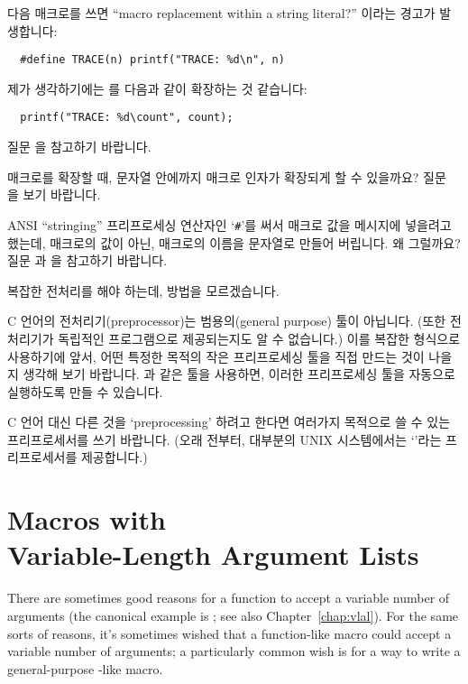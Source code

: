 \begin{faq}
	다음 매크로를 쓰면 ``macro replacement within a string literal?''
	이라는 경고가 발생합니다:
\begin{verbatim}
  #define TRACE(n) printf("TRACE: %d\n", n)
\end{verbatim}
	\noindent 제가 생각하기에는 를
	다음과 같이 확장하는 것 같습니다:
\begin{verbatim}
  printf("TRACE: %d\count", count);
\end{verbatim}

\A
	질문 을 참고하기 바랍니다.
\end{faq}

\begin{faq}
	매크로를 확장할 때, 문자열 안에까지 매크로 인자가 확장되게 할 수
        있을까요?
\A
	질문 을 보기 바랍니다.
\end{faq}

\begin{faq}
	ANSI ``stringing'' 프리프로세싱 연산자인 `\verb+#+'를 써서
        매크로 값을 메시지에 넣을려고 했는데, 매크로의 값이 아닌, 매크로의
        이름을 문자열로 만들어 버립니다. 왜 그럴까요?
\A
	질문 과 을 참고하기 바랍니다.
\end{faq}

\begin{faq}
	복잡한 전처리를 해야 하는데, 방법을 모르겠습니다.

\A
	C 언어의 전처리기(preprocessor)는 범용의(general purpose) 툴이
	아닙니다.  (또한 전처리기가 독립적인 프로그램으로 제공되는지도
	알 수 없습니다.) 이를 복잡한 형식으로 사용하기에 앞서,
	어떤 특정한 목적의 작은 프리프로세싱 툴을 직접 만드는 것이
	나을 지 생각해 보기 바랍니다.  과 같은 툴을 사용하면, 
	이러한 프리프로세싱 툴을 자동으로 실행하도록 만들 수 있습니다.

	C 언어 대신 다른 것을 `preprocessing' 하려고 한다면 여러가지 목적으로
        쓸 수 있는 프리프로세서를 쓰기 바랍니다.
	(오래 전부터, 대부분의 UNIX 시스템에서는 `'라는
	프리프로세서를 제공합니다.)
\end{faq}

\section{Macros with \\ Variable-Length Argument Lists}
There are sometimes good reasons for a function to accept a variable number
of arguments (the canonical example is ; see also Chapter~\ref{chap:vlal}).
For the same sorts of reasons, it's sometimes wished that a function-like
macro could accept a variable number of arguments; a particularly common
wish is for a way to write a general-purpose -like 
macro.

